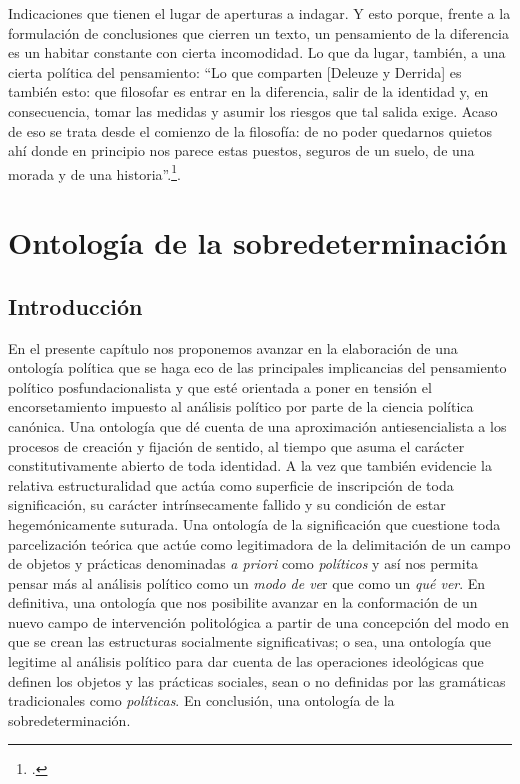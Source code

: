 Indicaciones que tienen el lugar de aperturas a indagar. Y esto porque,
frente a la formulación de conclusiones que cierren un texto, un
pensamiento de la diferencia es un habitar constante con cierta
incomodidad. Lo que da lugar, también, a una cierta política del
pensamiento: \enquote{Lo que comparten {[}Deleuze y Derrida{]} es también esto:
que filosofar es entrar en la diferencia, salir de la identidad y, en
consecuencia, tomar las medidas y asumir los riesgos que tal salida
exige. Acaso de eso se trata desde el comienzo de la filosofía: de no
poder quedarnos quietos ahí donde en principio nos parece estas puestos,
seguros de un suelo, de una morada y de una historia}.\footcite[261]{nancy2008}.

\chapter{Ontología de la sobredeterminación}
\author{Andrés Daín}

\section{Introducción}

En el presente capítulo nos proponemos avanzar en la elaboración de una
ontología política que se haga eco de las principales implicancias del
pensamiento político posfundacionalista y que esté orientada a poner en
tensión el encorsetamiento impuesto al análisis político por parte de la
ciencia política canónica. Una ontología que dé cuenta de una
aproximación antiesencialista a los procesos de creación y fijación de
sentido, al tiempo que asuma el carácter constitutivamente abierto de
toda identidad. A la vez que también evidencie la relativa
estructuralidad que actúa como superficie de inscripción de toda
significación, su carácter intrínsecamente fallido y su condición de
estar hegemónicamente suturada. Una ontología de la significación que
cuestione toda parcelización teórica que actúe como legitimadora de la
delimitación de un campo de objetos y prácticas denominadas \emph{a
priori} como \emph{políticos} y así nos permita pensar más al análisis
político como un \emph{modo de ve}r que como un \emph{qué ver}. En
definitiva, una ontología que nos posibilite avanzar en la conformación
de un nuevo campo de intervención politológica a partir de una
concepción del modo en que se crean las estructuras socialmente
significativas; o sea, una ontología que legitime al análisis político
para dar cuenta de las operaciones ideológicas que definen los objetos y
las prácticas sociales, sean o no definidas por las gramáticas
tradicionales como \emph{políticas}. En conclusión, una ontología de la
sobredeterminación.

